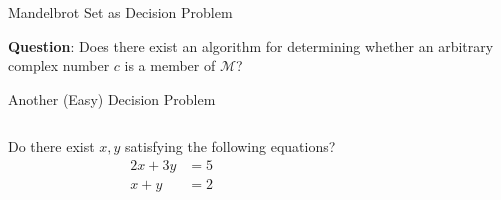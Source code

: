 \documentclass[c]{beamer}
\begin{document}
  
  


  
  

\begin{frame}{Mandelbrot Set as Decision Problem}
  
  \textbf{Question}: Does there exist an algorithm for determining
  whether an arbitrary complex number $c$ is a member of
  $\mathcal{M}$?
  
\end{frame}

\begin{frame}{Another (Easy) Decision Problem}
  
  \begin{columns}
    
    Do there exist $x, y$ satisfying the following equations?
    \begin{align*}
      2x + 3y &= 5\\
      x + y &= 2
    \end{align*}


    \begin{center}
    \end{center}
  \end{columns}
\end{frame}
\end{document}
